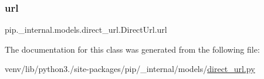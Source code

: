 \subsubsection{\texorpdfstring{url}{url}}
{\footnotesize\ttfamily pip.\+\_\+internal.\+models.\+direct\+\_\+url.\+Direct\+Url.\+url\hspace{0.3cm}{\ttfamily [static]}}



The documentation for this class was generated from the following file\+:\begin{DoxyCompactItemize}
\item 
venv/lib/python3./site-\/packages/pip/\+\_\+internal/models/\hyperlink{direct__url_8py}{direct\+\_\+url.\+py}\end{DoxyCompactItemize}
